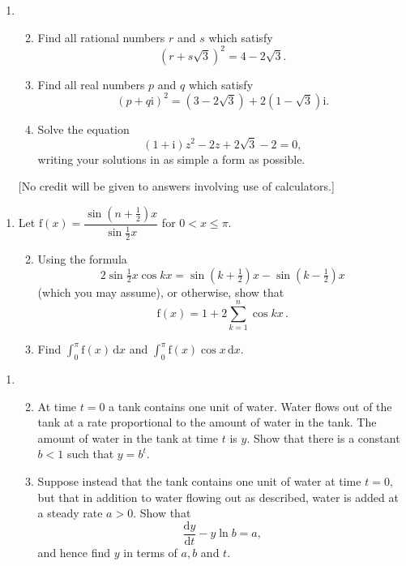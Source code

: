 \documentclass[a4, 11pt]{report}
\newlength{\qspace}
\newcounter{qnumber}
\newenvironment{question}%
 {\vspace{\qspace}
  \begin{enumerate}[\bfseries 1\quad][10]%
    \setcounter{enumi}{\value{qnumber}}%
    \item%
 }
{
  \end{enumerate}
  \filbreak
  \stepcounter{qnumber}
 }
\newenvironment{questionparts}[1][1]%
 {
  \begin{enumerate}[\bfseries (i)]%
    \setcounter{enumii}{#1}
    \addtocounter{enumii}{-1}
    \setlength{\itemsep}{5mm}
    \setlength{\parskip}{8pt}
 }
 {
  \end{enumerate}
 }
\begin{document}
\begin{question}
\begin{questionparts}
\item Find all rational numbers $r$ and $s$ which satisfy 
\[
(r+s\sqrt{3})^{2}=4-2\sqrt{3}.
\]
\item Find all real numbers $p$ and $q$ which satisfy 
\[
(p+q\mathrm{i})^{2}=(3-2\sqrt{3})+2(1-\sqrt{3})\mathrm{i}.
\]
\item Solve the equation 
\[
(1+\mathrm{i})z^{2}-2z+2\sqrt{3}-2=0,
\]
writing your solutions in as simple a form as possible. 
\end{questionparts}

{[}No credit will be given to answers involving use of calculators.{]} 

	\end{question}
	
\begin{question}
Let $\mathrm{f}(x)=\dfrac{\sin(n+\frac{1}{2})x}{\sin\frac{1}{2}x}$
for $0<x\leqslant\pi.$ 
\begin{questionparts}
\item Using the formula 
\[
2\sin\tfrac{1}{2}x\cos kx=\sin(k+\tfrac{1}{2})x-\sin(k-\tfrac{1}{2})x
\]
(which you may assume), or otherwise, show that 
\[
\mathrm{f}(x)=1+2\sum_{k=1}^{n}\cos kx\,.
\]
\item Find ${\displaystyle \int_{0}^{\pi}\mathrm{f}(x)\,\mathrm{d}x}$
and ${\displaystyle \int_{0}^{\pi}\mathrm{f}(x)\cos x\,\mathrm{d}x}.$ 
\end{questionparts}

\end{question}
	
\begin{question}
\begin{questionparts}
\item At time $t=0$ a tank contains one unit of water. Water flows
out of the tank at a rate proportional to the amount of water in the
tank. The amount of water in the tank at time $t$ is $y$. Show that
there is a constant $b<1$ such that $y=b^{t}.$ 
\item Suppose instead that the tank contains one unit of water at
time $t=0,$ but that in addition to water flowing out as described,
water is added at a steady rate $a>0.$ Show that 
\[
\frac{\mathrm{d}y}{\mathrm{d}t}-y\ln b=a,
\]
and hence find $y$ in terms of $a,b$ and $t$. 
\end{questionparts}

\end{question}
		
\end{document}
